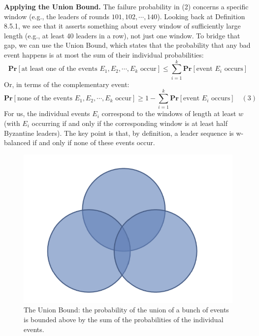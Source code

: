 \noindent
\textbf{Applying the Union Bound.} The failure probability in (2) concerns a specific window
(e.g., the leaders of rounds $101, 102, \cdots, 140$). Looking back at Definition 8.5.1, we see that
it asserts something about every window of sufficiently large length (e.g., at least 40 leaders
in a row), not just one window. To bridge that gap, we can use the Union Bound, which
states that the probability that any bad event happens is at most the sum of their individual
probabilities:
$$\textbf{Pr}[\text{at least one of the events $E_1, E_2, \cdots, E_k$ occur}] \leq \sum_{i=1}^k \textbf{Pr}[\text{event $E_i$ occurs}]$$
Or, in terms of the complementary event:
$$\textbf{Pr}[\text{none of the events $E_1, E_2, \cdots, E_k$ occur}] \geq 1 - \sum_{i=1}^k \textbf{Pr}[\text{event $E_i$ occurs}] \quad(3)$$
For us, the individual events $E_i$ correspond to the windows of length at least $w$ (with $E_i$
occurring if and only if the corresponding window is at least half Byzantine leaders). The key point is that, by definition, a leader sequence is w-balanced if and only if none of these
events occur.\\
\begin{figure}[h]
    \centering
    \includegraphics[scale = 0.5]{figures/f28.png}
    \caption{ The Union Bound: the probability of the union of a bunch of events is bounded
above by the sum of the probabilities of the individual events.
}
    \label{fig:mesh1}
\end{figure}\\


